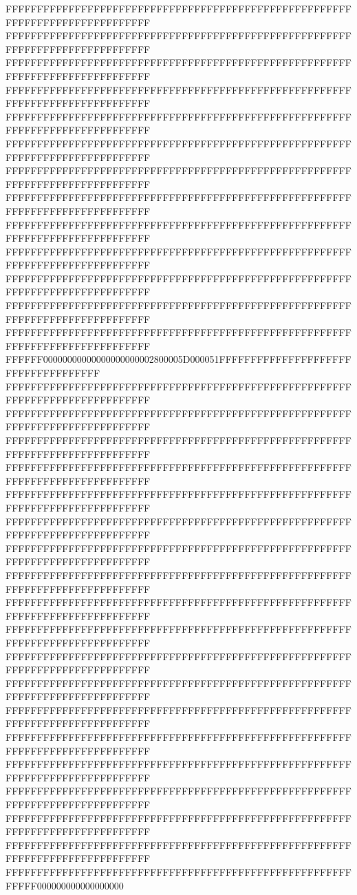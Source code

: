 FFFFFFFFFFFFFFFFFFFFFFFFFFFFFFFFFFFFFFFFFFFFFFFFFFFFFFFFFFFFFFFFFFFFFFFFFFFFFF
FFFFFFFFFFFFFFFFFFFFFFFFFFFFFFFFFFFFFFFFFFFFFFFFFFFFFFFFFFFFFFFFFFFFFFFFFFFFFF
FFFFFFFFFFFFFFFFFFFFFFFFFFFFFFFFFFFFFFFFFFFFFFFFFFFFFFFFFFFFFFFFFFFFFFFFFFFFFF
FFFFFFFFFFFFFFFFFFFFFFFFFFFFFFFFFFFFFFFFFFFFFFFFFFFFFFFFFFFFFFFFFFFFFFFFFFFFFF
FFFFFFFFFFFFFFFFFFFFFFFFFFFFFFFFFFFFFFFFFFFFFFFFFFFFFFFFFFFFFFFFFFFFFFFFFFFFFF
FFFFFFFFFFFFFFFFFFFFFFFFFFFFFFFFFFFFFFFFFFFFFFFFFFFFFFFFFFFFFFFFFFFFFFFFFFFFFF
FFFFFFFFFFFFFFFFFFFFFFFFFFFFFFFFFFFFFFFFFFFFFFFFFFFFFFFFFFFFFFFFFFFFFFFFFFFFFF
FFFFFFFFFFFFFFFFFFFFFFFFFFFFFFFFFFFFFFFFFFFFFFFFFFFFFFFFFFFFFFFFFFFFFFFFFFFFFF
FFFFFFFFFFFFFFFFFFFFFFFFFFFFFFFFFFFFFFFFFFFFFFFFFFFFFFFFFFFFFFFFFFFFFFFFFFFFFF
FFFFFFFFFFFFFFFFFFFFFFFFFFFFFFFFFFFFFFFFFFFFFFFFFFFFFFFFFFFFFFFFFFFFFFFFFFFFFF
FFFFFFFFFFFFFFFFFFFFFFFFFFFFFFFFFFFFFFFFFFFFFFFFFFFFFFFFFFFFFFFFFFFFFFFFFFFFFF
FFFFFFFFFFFFFFFFFFFFFFFFFFFFFFFFFFFFFFFFFFFFFFFFFFFFFFFFFFFFFFFFFFFFFFFFFFFFFF
FFFFFFFFFFFFFFFFFFFFFFFFFFFFFFFFFFFFFFFFFFFFFFFFFFFFFFFFFFFFFFFFFFFFFFFFFFFFFF
FFFFFF00000000000000000000002800005D000051FFFFFFFFFFFFFFFFFFFFFFFFFFFFFFFFFFFF
FFFFFFFFFFFFFFFFFFFFFFFFFFFFFFFFFFFFFFFFFFFFFFFFFFFFFFFFFFFFFFFFFFFFFFFFFFFFFF
FFFFFFFFFFFFFFFFFFFFFFFFFFFFFFFFFFFFFFFFFFFFFFFFFFFFFFFFFFFFFFFFFFFFFFFFFFFFFF
FFFFFFFFFFFFFFFFFFFFFFFFFFFFFFFFFFFFFFFFFFFFFFFFFFFFFFFFFFFFFFFFFFFFFFFFFFFFFF
FFFFFFFFFFFFFFFFFFFFFFFFFFFFFFFFFFFFFFFFFFFFFFFFFFFFFFFFFFFFFFFFFFFFFFFFFFFFFF
FFFFFFFFFFFFFFFFFFFFFFFFFFFFFFFFFFFFFFFFFFFFFFFFFFFFFFFFFFFFFFFFFFFFFFFFFFFFFF
FFFFFFFFFFFFFFFFFFFFFFFFFFFFFFFFFFFFFFFFFFFFFFFFFFFFFFFFFFFFFFFFFFFFFFFFFFFFFF
FFFFFFFFFFFFFFFFFFFFFFFFFFFFFFFFFFFFFFFFFFFFFFFFFFFFFFFFFFFFFFFFFFFFFFFFFFFFFF
FFFFFFFFFFFFFFFFFFFFFFFFFFFFFFFFFFFFFFFFFFFFFFFFFFFFFFFFFFFFFFFFFFFFFFFFFFFFFF
FFFFFFFFFFFFFFFFFFFFFFFFFFFFFFFFFFFFFFFFFFFFFFFFFFFFFFFFFFFFFFFFFFFFFFFFFFFFFF
FFFFFFFFFFFFFFFFFFFFFFFFFFFFFFFFFFFFFFFFFFFFFFFFFFFFFFFFFFFFFFFFFFFFFFFFFFFFFF
FFFFFFFFFFFFFFFFFFFFFFFFFFFFFFFFFFFFFFFFFFFFFFFFFFFFFFFFFFFFFFFFFFFFFFFFFFFFFF
FFFFFFFFFFFFFFFFFFFFFFFFFFFFFFFFFFFFFFFFFFFFFFFFFFFFFFFFFFFFFFFFFFFFFFFFFFFFFF
FFFFFFFFFFFFFFFFFFFFFFFFFFFFFFFFFFFFFFFFFFFFFFFFFFFFFFFFFFFFFFFFFFFFFFFFFFFFFF
FFFFFFFFFFFFFFFFFFFFFFFFFFFFFFFFFFFFFFFFFFFFFFFFFFFFFFFFFFFFFFFFFFFFFFFFFFFFFF
FFFFFFFFFFFFFFFFFFFFFFFFFFFFFFFFFFFFFFFFFFFFFFFFFFFFFFFFFFFFFFFFFFFFFFFFFFFFFF
FFFFFFFFFFFFFFFFFFFFFFFFFFFFFFFFFFFFFFFFFFFFFFFFFFFFFFFFFFFFFFFFFFFFFFFFFFFFFF
FFFFFFFFFFFFFFFFFFFFFFFFFFFFFFFFFFFFFFFFFFFFFFFFFFFFFFFFFFFFFFFFFFFFFFFFFFFFFF
FFFFFFFFFFFFFFFFFFFFFFFFFFFFFFFFFFFFFFFFFFFFFFFFFFFFFFFFFFFFFFFFFFFFFFFFFFFFFF
FFFFFFFFFFFFFFFFFFFFFFFFFFFFFFFFFFFFFFFFFFFFFFFFFFFFFFFFFFFF000000000000000000
